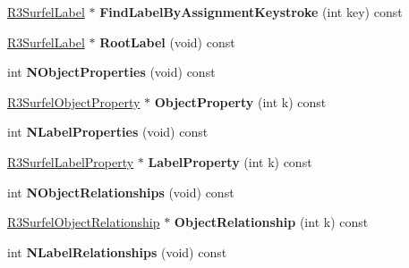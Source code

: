 \begin{DoxyCompactItemize}
\item 
\hyperlink{class_r3_surfel_label}{R3\+Surfel\+Label} $\ast$ {\bfseries Find\+Label\+By\+Assignment\+Keystroke} (int key) const \hypertarget{class_r3_surfel_scene_ab3528dd8cd14f89d0a1e28c0a28233d8}{}\label{class_r3_surfel_scene_ab3528dd8cd14f89d0a1e28c0a28233d8}

\item 
\hyperlink{class_r3_surfel_label}{R3\+Surfel\+Label} $\ast$ {\bfseries Root\+Label} (void) const \hypertarget{class_r3_surfel_scene_ad977eb03cd0721a2824f1e8d3b7e21c3}{}\label{class_r3_surfel_scene_ad977eb03cd0721a2824f1e8d3b7e21c3}

\item 
int {\bfseries N\+Object\+Properties} (void) const \hypertarget{class_r3_surfel_scene_aee63940c67184c7dbde0ed831745abe3}{}\label{class_r3_surfel_scene_aee63940c67184c7dbde0ed831745abe3}

\item 
\hyperlink{class_r3_surfel_object_property}{R3\+Surfel\+Object\+Property} $\ast$ {\bfseries Object\+Property} (int k) const \hypertarget{class_r3_surfel_scene_a990f21e9470403781aeccace1a1a38ff}{}\label{class_r3_surfel_scene_a990f21e9470403781aeccace1a1a38ff}

\item 
int {\bfseries N\+Label\+Properties} (void) const \hypertarget{class_r3_surfel_scene_ad511d5aebf6424385407e9e3c7fb8ee5}{}\label{class_r3_surfel_scene_ad511d5aebf6424385407e9e3c7fb8ee5}

\item 
\hyperlink{class_r3_surfel_label_property}{R3\+Surfel\+Label\+Property} $\ast$ {\bfseries Label\+Property} (int k) const \hypertarget{class_r3_surfel_scene_aedc1efc6daa22f59ae7e8d74bc506cf5}{}\label{class_r3_surfel_scene_aedc1efc6daa22f59ae7e8d74bc506cf5}

\item 
int {\bfseries N\+Object\+Relationships} (void) const \hypertarget{class_r3_surfel_scene_ae242fd487ff6b51034f564197556def2}{}\label{class_r3_surfel_scene_ae242fd487ff6b51034f564197556def2}

\item 
\hyperlink{class_r3_surfel_object_relationship}{R3\+Surfel\+Object\+Relationship} $\ast$ {\bfseries Object\+Relationship} (int k) const \hypertarget{class_r3_surfel_scene_a16e49e0502eef548480b24095d0773d6}{}\label{class_r3_surfel_scene_a16e49e0502eef548480b24095d0773d6}

\item 
int {\bfseries N\+Label\+Relationships} (void) const \hypertarget{class_r3_surfel_scene_aad4cc50e0264b50fcf9d23ed218a5fd0}{}\label{class_r3_surfel_scene_aad4cc50e0264b50fcf9d23ed218a5fd0}


\end{DoxyCompactItemize}
